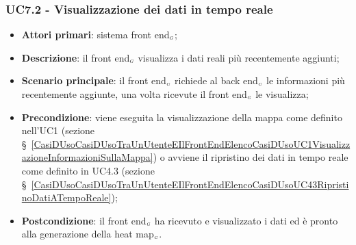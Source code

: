 \subsubsection{UC7.2 - Visualizzazione dei dati in tempo reale}\label{CasiDUsoCasiDUsoTraIlFrontEndEIlBackEndElencoDeiCasiDUsoUC72VisualizzazioneDeiDatiInTempoReale}
\begin{itemize}
	\item \textbf{Attori primari}: sistema front end$_{\scaleto{G}{3pt}}$;
	\item \textbf{Descrizione}: il front end$_{\scaleto{G}{3pt}}$ visualizza i dati reali più recentemente aggiunti;
	\item \textbf{Scenario principale}: il front end$_{\scaleto{G}{3pt}}$ richiede al back end$_{\scaleto{G}{3pt}}$ le informazioni più recentemente aggiunte, una volta ricevute il front end$_{\scaleto{G}{3pt}}$ le visualizza;
	\item \textbf{Precondizione}: viene eseguita la visualizzazione della mappa come definito nell’UC1 (sezione \S~\ref{CasiDUsoCasiDUsoTraUnUtenteEIlFrontEndElencoCasiDUsoUC1VisualizzazioneInformazioniSullaMappa}) o avviene il ripristino dei dati in tempo reale come definito in UC4.3 (sezione \S~\ref{CasiDUsoCasiDUsoTraUnUtenteEIlFrontEndElencoCasiDUsoUC43RipristinoDatiATempoReale});
	\item \textbf{Postcondizione}: il front end$_{\scaleto{G}{3pt}}$ ha ricevuto e visualizzato i dati ed è pronto alla generazione della heat map$_{\scaleto{G}{3pt}}$. 
\end{itemize}

